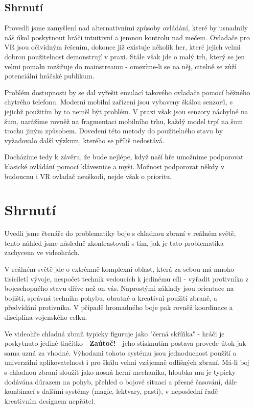 \subsection{Shrnutí}
Provedli jsme zamyšlení nad alternativními způsoby ovládání, které by usnadnily náš úkol poskytnout hráči intuitivní a jemnou kontrolu nad mečem. Ovladače pro \acs{VR} jsou očividným řešením, dokonce již existuje několik her, které jejich velmi dobrou použitelnost demonstrují v praxi. Stále však jde o malý trh, který se jen velmi pomalu rozšiřuje do mainstreamu - omezíme-li se na něj, citelně se zůží potenciální hráčské publikum.

Problém dostupnosti by se dal vyřešit emulací takového ovladače pomocí běžného chytrého telefonu. Moderní mobilní zařízení jsou vybaveny škálou senzorů, s jejichž použitím by to neměl být problém. V praxi však jsou senzory náchylné na šum, narážíme rovněž na fragmentaci mobilního trhu, každý model trpí na šum trochu jiným způsobem. Dovedení této metody do použitelného stavu by vyžadovalo další výzkum, kterého se příliš nedostává.

Docházíme tedy k závěru, že bude nejlépe, když naší hře umožníme podporovat klasické ovládání pomocí klávesnice a myši. Možnost podporovat někdy v budoucnu i \acs{VR} ovladač neuškodí, nejde však o prioritu.

\section{Shrnutí}

Uvedli jsme čtenáře do problematiky boje s chladnou zbraní v reálném světě, tento náhled jsme následně zkontrastovali s tím, jak je tato problematika zachycena ve videohrách.

V reálném světě jde o extrémně komplexní oblast, která za sebou má mnoho tisíciletí vývoje, nespočet technik vedoucích k jedinému cíli - vyřadit protivníka z bojeschopného stavu dříve než on vás. Naprostými základy jsou orientace na bojišti, správná technika pohybu, obratné a kreativní použití zbraně, a předvídání protivníka. V případě hromadného boje pak rovněž koordinace a disciplína vojenského celku. 

Ve videohře chladná zbraň typicky figuruje jako "černá skříňka" - hráči je poskytnuto jediné tlačítko - \textbf{Zaútoč!} - jeho stisknutím postava provede útok jak sama uzná za vhodné. Výhodami tohoto systému jsou jednoduchost použití a univerzální aplikovatelnost i pro škálu velmi vzájemně odlišných zbraní. Má-li boj s chladnou zbraní sloužit jako nosná herní mechanika, hloubka mu je typicky dodávána důrazem na pohyb, přehled o bojové situaci a přesné časování, dále kombinací s dalšími systémy (magie, lektvary, pasti), v neposlední řadě kreativním designem nepřátel.


